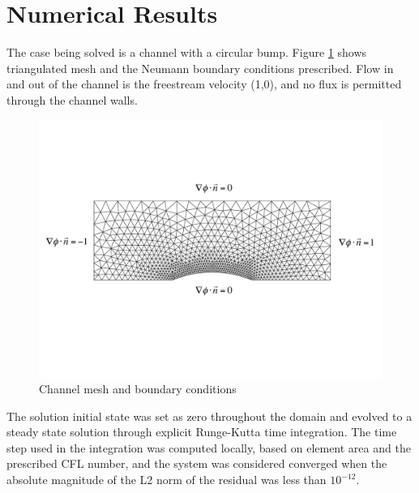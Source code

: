 \documentclass[a4paper]{article}
\begin{document}
\section{Numerical Results}
The case being solved is a channel with a circular bump.  Figure
\ref{fig:boundary-conditions} shows triangulated mesh and the Neumann boundary conditions
prescribed.  Flow in and out of the channel is the freestream velocity (1,0),
and no flux is permitted through the channel walls.
\begin{figure}[h]
  \centering
  \includegraphics[width=\textwidth,trim={0 4cm 0 4cm},clip]{figures/boundary_conditions}
  \caption{Channel mesh and boundary conditions}
  \label{fig:boundary-conditions}
\end{figure}
The solution initial state was set as zero throughout the domain and evolved to
a steady state solution through explicit Runge-Kutta time integration.  The
time step used in the integration was computed locally, based on element area
and the prescribed CFL number, and the system was considered converged when the
absolute magnitude of the L2 norm of the residual was less than $10^{-12}$.
\end{document}
